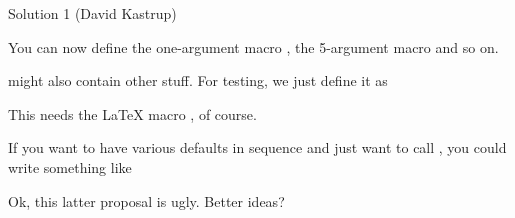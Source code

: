 \begin{solution}{Solution 1 (David Kastrup)}


\begin{lcode}
\def\printdate{\count@\z@\toks@{}\printdate@a} 
\def\printdate@a{\@ifnextchar[{\printdate@b}{\printdate@c}}
\def\printdate@b[#1]{\toks@\expandafter{\the\toks@{#1}}%
  \advance\count@\@ne\printdate@a} 
\def\printdate@c{\csname printdate@@\romannumeral\count@
  \expandafter\endcsname\the\toks@}
\end{lcode}

    You can now define the one-argument macro \cmd{\printdate@@i}, the 
5-argument macro \cmd{\printdate@@v} and so on.

    \cmd{\printdate@c} might also contain other stuff. For testing, 
we just define it as
\begin{lcode}
\def\printdate@c{\message{\number\count@\space arguments: \the\toks@}}
\end{lcode}

    This needs the LaTeX macro \cmd{\@ifnextchar}, of course. 

    If you want to have various defaults in sequence and just want to 
call \cmd{\printdate@@v}, you could write something like 
\begin{lcode}
\def\printdate@c{\let\gobble@x\relax\expandafter\newcommand
  \expandafter\gobble@x\expandafter[\number\count@]{}%
  \edef\next{{Tuesday}{17}{9}{2002}{Gregorian calendar}%
  \the\toks@}\expandafter\expandafter\expandafter
  \printdate@@v\expandafter\gobble@x\next}
\end{lcode}

    Ok, this latter proposal is ugly. Better ideas?
\end{solution}


